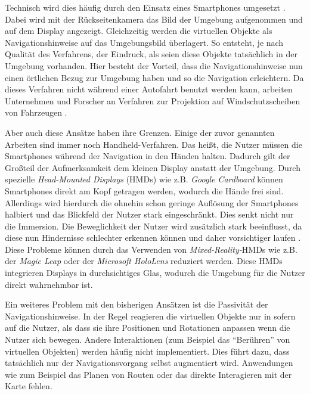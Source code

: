 \documentclass[a4paper]{scrartcl}
\begin{document}
Technisch wird dies häufig durch den Einsatz eines Smartphones umgesetzt \autocites{Morrison2009}{Mulloni2012}{Alnabhan2014}.
Dabei wird mit der Rückseitenkamera das Bild der Umgebung aufgenommen und auf dem Display angezeigt.
Gleichzeitig werden die virtuellen Objekte als Navigationshinweise auf das Umgebungsbild überlagert.
So entsteht, je nach Qualität des Verfahrens, der Eindruck, als seien diese Objekte tatsächlich in der Umgebung vorhanden.
Hier besteht der Vorteil, dass die Navigationshinweise nun einen örtlichen Bezug zur Umgebung haben und so die Navigation erleichtern.
Da dieses Verfahren nicht während einer Autofahrt benutzt werden kann, arbeiten Unternehmen und Forscher an Verfahren zur Projektion auf Windschutzscheiben von Fahrzeugen \autocites{Kim2009}{Sygic2018}{Cunningham2017}.

Aber auch diese Ansätze haben ihre Grenzen.
Einige der zuvor genannten Arbeiten sind immer noch Handheld-Verfahren.
Das heißt, die Nutzer müssen die Smartphones während der Navigation in den Händen halten.
Dadurch gilt der Großteil der Aufmerksamkeit dem kleinen Display anstatt der Umgebung.
Durch spezielle \emph{Head-Mounted Displays} (HMDs) wie z.B. \emph{Google Cardboard} \autocite{Google2018a} können Smartphones direkt am Kopf getragen werden, wodurch die Hände frei sind.
Allerdings wird hierdurch die ohnehin schon geringe Auflösung der Smartphones halbiert und das Blickfeld der Nutzer stark eingeschränkt.
Dies senkt nicht nur die Immersion.
Die Beweglichkeit der Nutzer wird zusätzlich stark beeinflusst, da diese nun Hindernisse schlechter erkennen können und daher vorsichtiger laufen \autocite[2]{Bonfert2017}.
Diese Probleme können durch das Verwenden von \emph{Mixed-Reality-}HMDs wie z.B. der \emph{Magic Leap} \autocite{MagicLeap2018} oder der \emph{Microsoft HoloLens} \autocite{Microsoft2018} reduziert werden.
Diese HMDs integrieren Displays in durchsichtiges Glas, wodurch die Umgebung für die Nutzer direkt wahrnehmbar ist.

Ein weiteres Problem mit den bisherigen Ansätzen ist die Passivität der Navigationshinweise.
In der Regel reagieren die virtuellen Objekte nur in sofern auf die Nutzer, als dass sie ihre Positionen und Rotationen anpassen wenn die Nutzer sich bewegen.
Andere Interaktionen (zum Beispiel das \enquote{Berühren} von virtuellen Objekten) werden häufig nicht implementiert.
Dies führt dazu, dass tatsächlich nur der Navigationsvorgang selbst augmentiert wird.
Anwendungen wie zum Beispiel das Planen von Routen oder das direkte Interagieren mit der Karte fehlen.
\end{document}
